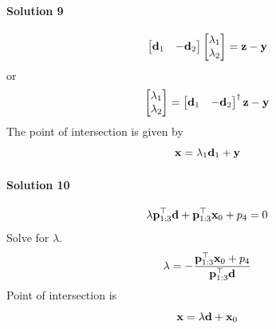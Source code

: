 \documentclass{article}
\begin{document}
\paragraph*{Solution 9}
\[
  \begin{bmatrix}\mathbf{d}_1& -\mathbf{d}_2\end{bmatrix}\begin{bmatrix} \lambda_1 \\
    \lambda_2\end{bmatrix} = \mathbf{z} - \mathbf{y}
  \]
  or
  \[ \begin{bmatrix} \lambda_1 \\
      \lambda_2\end{bmatrix} = \begin{bmatrix}\mathbf{d}_1&
      -\mathbf{d}_2\end{bmatrix}^\dagger \mathbf{z} - \mathbf{y}
    \]
    The point of intersection is given by
    \[ \mathbf{x} = \lambda_1 \mathbf{d}_1 + \mathbf{y} \]
\paragraph*{Solution 10}

\[
  \lambda \mathbf{p}_{1:3}^\top \mathbf{d} + \mathbf{p}_{1:3}^\top \mathbf{x}_0  + p_4 = 0
  \]
  Solve for $\lambda$.
  \[
    \lambda = -\frac{\mathbf{p}_{1:3}^\top \mathbf{x}_0  + p_4}{\mathbf{p}_{1:3}^\top \mathbf{d}}
    \]
    Point of intersection is
    \[
      \mathbf{x} = \lambda \mathbf{d} + \mathbf{x}_0
      \]
\end{document}
